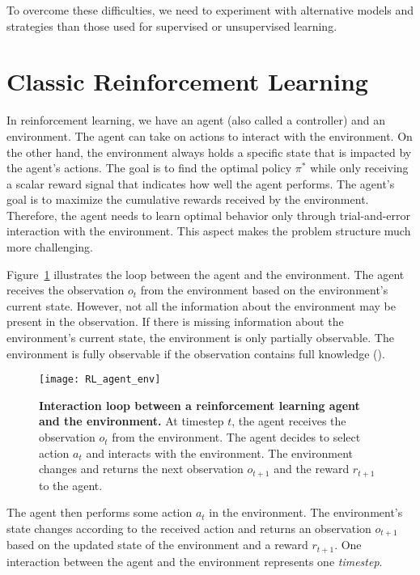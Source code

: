 To overcome these difficulties, we need to experiment with alternative models and strategies than those used for supervised or unsupervised learning.



\section{Classic Reinforcement Learning}
In reinforcement learning, we have an agent (also called a controller) and an environment. The agent can take on actions to interact with the environment. On the other hand, the environment always holds a specific state that is impacted by the agent's actions. The goal is to find the optimal policy $\pi^*$ while only receiving a scalar reward signal that indicates how well the agent performs. The agent's goal is to maximize the cumulative rewards received by the environment. Therefore, the agent needs to learn optimal behavior only through trial-and-error interaction with the environment. This aspect makes the problem structure much more challenging.

Figure~\ref{fig:RL_agent_env} illustrates the loop between the agent and the environment. The agent receives the observation $o_t$ from the environment based on the environment's current state. However, not all the information about the environment may be present in the observation. If there is missing information about the environment's current state, the environment is only partially observable. The environment is fully observable if the observation contains full knowledge (\cite{dong2020deep}).
\begin{figure}[!ht]
\centering
\texttt{[image: RL\_agent\_env]}
\caption[Interaction loop between a reinforcement learning agent and the environment]{
  \textbf{Interaction loop between a reinforcement learning agent and the environment.}
  At timestep $t$, the agent receives the observation $o_t$ from the environment. The agent decides to select action $a_t$ and interacts with the environment. The environment changes and returns the next observation $o_{t+1}$ and the reward $r_{t+1}$ to the agent.
 }
\label{fig:RL_agent_env}
\end{figure}
The agent then performs some action $a_t$ in the environment. The environment's state changes according to the received action and returns an observation $o_{t+1}$ based on the updated state of the environment and a reward $r_{t+1}$. One interaction between the agent and the environment represents one \emph{timestep}.

